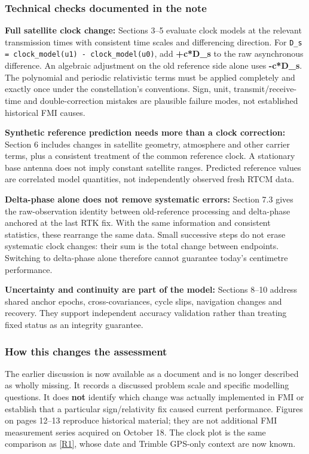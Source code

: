 \documentclass[11pt,a4paper]{article}
\numberwithin{equation}{section}
\numberwithin{figure}{section}
\begin{document}
\subsubsection{Technical checks documented in the note}

\textbf{Full satellite clock change:} Sections 3–5 evaluate clock models at the relevant transmission times with consistent time scales and differencing direction. For {\small\texttt{D\_\allowbreak{}s = clock\_\allowbreak{}model(u1) - clock\_\allowbreak{}model(u0)}}, add \textbf{+c*D\_s} to the raw asynchronous difference. An algebraic adjustment on the old reference side alone uses \textbf{-c*D\_s}. The polynomial and periodic relativistic terms must be applied completely and exactly once under the constellation's conventions. Sign, unit, transmit/\allowbreak{}receive-time and double-correction mistakes are plausible failure modes, not established historical FMI causes.

\textbf{Synthetic reference prediction needs more than a clock correction:} Section 6 includes changes in satellite geometry, atmosphere and other carrier terms, plus a consistent treatment of the common reference clock. A stationary base antenna does not imply constant satellite ranges. Predicted reference values are correlated model quantities, not independently observed fresh RTCM data.

\textbf{Delta-phase alone does not remove systematic errors:} Section 7.3 gives the raw-observation identity between old-reference processing and delta-phase anchored at the last RTK fix. With the same information and consistent statistics, these rearrange the same data. Small successive steps do not erase systematic clock changes: their sum is the total change between endpoints. Switching to delta-phase alone therefore cannot guarantee today's centimetre performance.

\textbf{Uncertainty and continuity are part of the model:} Sections 8–10 address shared anchor epochs, cross-covariances, cycle slips, navigation changes and recovery. They support independent accuracy validation rather than treating fixed status as an integrity guarantee.

\subsubsection{How this changes the assessment}

The earlier discussion is now available as a document and is no longer described as wholly missing. It records a discussed problem scale and specific modelling questions. It does \textbf{not} identify which change was actually implemented in FMI or establish that a particular sign/\allowbreak{}relativity fix caused current performance. Figures on pages 12–13 reproduce historical material; they are not additional FMI measurement series acquired on October 18. The clock plot is the same comparison as \hyperlink{ref-R1}{[R1]}, whose date and Trimble GPS-only context are now known.
\end{document}
